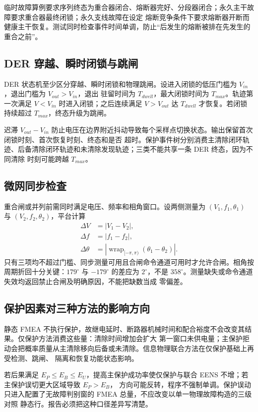 临时故障算例要求序列终态为重合器闭合、熔断器完好、分段器闭合；永久主干故障要求重合器最终闭锁；永久支线故障在设定
熔断竞争条件下要求熔断器开断而健康主干恢复。测试同时检查事件时间单调，防止“后发生的熔断被排在先发生的重合之前”。

\subsection{DER 穿越、瞬时闭锁与跳闸}
DER 状态机至少区分穿越、瞬时闭锁和物理跳闸。设进入闭锁的低压门槛为 $V_{in}$，退出门槛为 $V_{out}>V_{in}$，退出
驻留时间为 $T_{dwell}$，最大闭锁时间为 $T_{max}$。轨迹第一次满足 $V<V_{in}$ 时进入闭锁；之后连续满足
$V>V_{out}$ 达 $T_{dwell}$ 才恢复。若闭锁持续超过 $T_{max}$，终态升级为跳闸。

迟滞 $V_{out}-V_{in}$ 防止电压在边界附近抖动导致每个采样点切换状态。输出保留首次闭锁时刻、首次恢复时刻、终态和是否
超时。保护事件树分别消费主清除闭环轨迹、后备清除闭环轨迹和未清除发现轨迹；三类不能共享一条 DER 终态，因为不同清除
时刻可能跨越 $T_{max}$。

\subsection{微网同步检查}
重合闸或并列前需同时满足电压、频率和相角窗口。设两侧测量为 $(V_1,f_1,\theta_1)$ 与
$(V_2,f_2,\theta_2)$，平台计算
\begin{align}
 \Delta V&=|V_1-V_2|,\\
 \Delta f&=|f_1-f_2|,\\
 \Delta\theta&=\left|\operatorname{wrap}_{[-\pi,\pi)}(\theta_1-\theta_2)\right|.
\end{align}
只有三项均不超过门槛、同步测量可用且合闸命令通道可用时才允许合闸。相角按周期折回十分关键：$179^\circ$ 与
$-179^\circ$ 的差应为 $2^\circ$，不是 $358^\circ$。测量缺失或命令通道失效均返回禁止合闸及明确原因，不能把缺数当成
零偏差。

\subsection{保护因素对三种方法的影响方向}
静态 FMEA 不执行保护，故继电延时、断路器机械时间和配合裕度不会改变其结果。仅保护方法消费这些量：清除时间增加会扩大
第一窗口未供电量；主保护拒动会把概率质量从主清除移向后备或未清除。信息物理联合方法在仅保护基础上再受检测、跳闸、
隔离和恢复功能状态影响。

若后果满足 $E_P\le E_B\le E_U$，提高主保护成功率使仅保护与联合 EENS 不增；若主保护误切更大区域导致 $E_P>E_B$，
方向可能反转，程序不强制单调。保护误动只进入配置了无故障判别窗的 FMEA 总量，不应改变以单一物理故障构造的三级对照
静态行。报告必须把这种口径差异写清楚。

